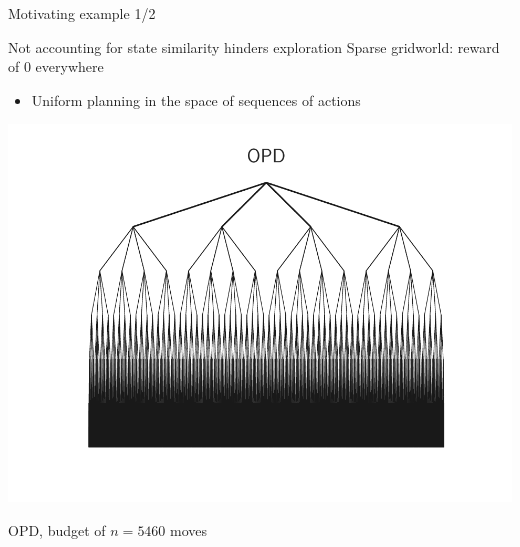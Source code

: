 \documentclass[slideopt,A4,showboxes,svgnames]{beamer}
\begin{document}
\begin{frame}{Motivating example 1/2}
\begin{alertblock}{Not accounting for state similarity hinders exploration}
	\pause
	Sparse gridworld: reward of 0 everywhere
	\pause
	\begin{itemize}
		\item[\incarrow] \alert{Uniform planning} in the space of sequences of actions %
	\end{itemize}
	\begin{center}
		\includegraphics[trim={0 1cm 0 1.5cm},clip,width=0.7\linewidth]{../img/tree_OPD}

		OPD, budget of $n=5460$ moves
	\end{center}
\end{alertblock}
\end{frame}
\end{document}
